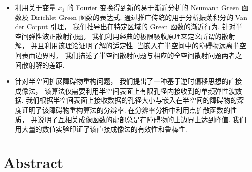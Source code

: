 \begin{itemize}
	\item  利用关于变量 $x_1$ 的 Fourier 变换得到新的易于渐近分析的 Neumann Green 函数及 Dirichlet Green 函数的表达式. 通过推广传统的用于分析振荡积分的 Van der Corput 引理，  我们推导出在特定区域的 Green 函数的渐近行为. 针对半空间弹性波正散射问题，  我们利用经典的极限吸收原理来定义所谓的散射解， 并且利用该理论证明了解的适定性.  当嵌入在半空间中的障碍物远离半空间表面边界时， 我们描述了半空间散射问题与相应的全空间散射问题两者之间散射解的差距. 
	
	\item 针对半空间扩展障碍物重构问题，  我们提出了一种基于逆时偏移思想的直接成像法， 该算法仅需要利用半空间表面上有限孔径内接收到的单频弹性波数据. 我们根据半空间表面上接收数据的孔径大小与嵌入在半空间的障碍物的深度证明了该障碍物重构算法的分辨率. 在分辨率分析中利用点扩散函数的性质， 并说明了互相关成像函数的虚部总是在障碍物的上边界上达到峰值. 我们用大量的数值实验印证了该直接成像法的有效性和鲁棒性. 
\end{itemize}

\chapter*{Abstract}%

